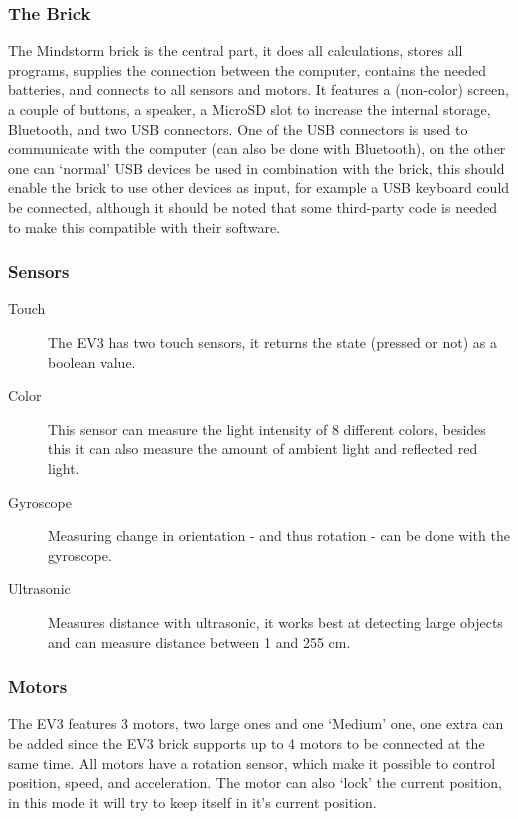 \subsubsection{The Brick}
The Mindstorm brick is the central part, it does all calculations, stores all programs, supplies the connection between the computer, contains the needed batteries, and connects to all sensors and motors. It features a (non-color) screen, a couple of buttons, a speaker, a MicroSD slot to increase the internal storage, Bluetooth, and two USB connectors. One of the USB connectors is used to communicate with the computer (can also be done with Bluetooth), on the other one can `normal' USB devices be used in combination with the brick, this should enable the brick to use other devices as input, for example a USB keyboard could be connected, although it should be noted that some third-party code is needed to make this compatible with their software.

\subsubsection{Sensors}
\begin{description}
	\item[Touch] The EV3 has two touch sensors, it returns the state (pressed or not) as a boolean value.
	\item[Color] This sensor can measure the light intensity of 8 different colors, besides this it can also measure the amount of ambient light and reflected red light.
	\item[Gyroscope] Measuring change in orientation - and thus rotation - can be done with the gyroscope.
	\item[Ultrasonic] Measures distance with ultrasonic, it works best at detecting large objects and can measure distance between 1 and 255 cm.
\end{description}

\subsubsection{Motors}
The EV3 features 3 motors, two large ones and one `Medium' one, one extra can be added since the EV3 brick supports up to 4 motors to be connected at the same time. All motors have a rotation sensor, which make it possible to control position, speed, and acceleration. The motor can also `lock' the current position, in this mode it will try to keep itself in it's current position.

